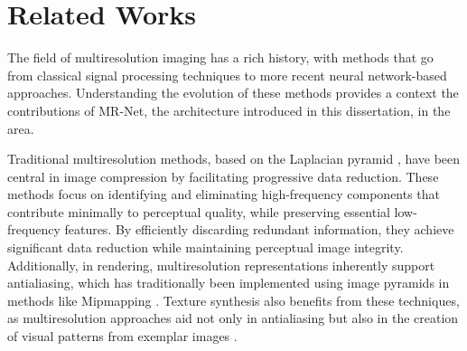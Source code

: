 








\section{Related Works}

The field of multiresolution imaging has a rich history, with methods that go from classical signal processing techniques to more recent neural network-based approaches. Understanding the evolution of these methods provides a context the contributions of MR-Net, the architecture introduced in this dissertation, in the area.

Traditional multiresolution methods, based on the Laplacian pyramid \citep{burt1987laplacian}, have been central in image compression by facilitating progressive data reduction. These methods focus on identifying and eliminating high-frequency components that contribute minimally to perceptual quality, while preserving essential low-frequency features. By efficiently discarding redundant information, they achieve significant data reduction while maintaining perceptual image integrity. Additionally, in rendering, multiresolution representations inherently support antialiasing, which has traditionally been implemented using image pyramids in methods like Mipmapping \citep{mipmap83}. Texture synthesis also benefits from these techniques, as multiresolution approaches aid not only in antialiasing but also in the creation of visual patterns from exemplar images \citep{thies19}.


